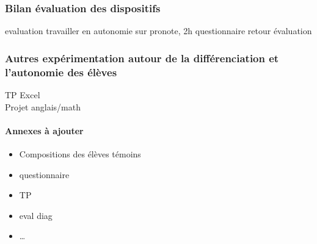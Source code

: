 \subsubsection*{Bilan évaluation des dispositifs}
evaluation travailler en autonomie sur pronote, 2h
questionnaire
retour évaluation
\subsubsection*{Autres expérimentation autour de la différenciation et l'autonomie des élèves}
TP Excel\\
Projet anglais/math
\paragraph{Annexes à ajouter}
\begin{itemize}
	\item Compositions des élèves témoins
	\item questionnaire
	\item TP
	\item eval diag
	\item \ldots
\end{itemize}